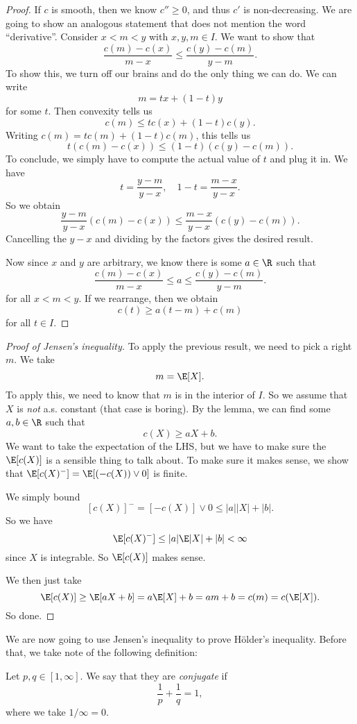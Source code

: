 \documentclass[a4paper]{article}
\begin{document}
\begin{proof}
  If $c$ is smooth, then we know $c'' \geq 0$, and thus $c'$ is non-decreasing. We are going to show an analogous statement that does not mention the word ``derivative''. Consider $x < m < y$ with $x, y, m \in I$. We want to show that
   \[
    \frac{c(m) - c(x)}{m - x} \leq \frac{c(y) - c(m)}{y - m}.
  \]
  To show this, we turn off our brains and do the only thing we can do. We can write
  \[
    m = tx + (1 - t) y
  \]
  for some $t$. Then convexity tells us
  \[
    c(m) \leq t c(x) + (1 - t) c(y).
  \]
  Writing $c(m) = t c(m) + (1 - t) c(m)$, this tells us
  \[
    t (c(m) - c(x)) \leq (1 - t)(c(y) - c(m)).
  \]
  To conclude, we simply have to compute the actual value of $t$ and plug it in. We have
  \[
    t = \frac{y - m}{y - x},\quad 1 - t = \frac{m - x}{y - x}.
  \]
  So we obtain
  \[
    \frac{y - m}{y - x} (c(m) - c(x)) \leq \frac{m - x}{y - x} (c(y) - c(m)).
  \]
  Cancelling the $y - x$ and dividing by the factors gives the desired result.

  Now since $x$ and $y$ are arbitrary, we know there is some $a \in \R$ such that
  \[
    \frac{c(m) - c(x)}{m - x} \leq a \leq \frac{c(y) - c(m)}{y - m}.
  \]
  for all $x < m < y$. If we rearrange, then we obtain
  \[
    c(t) \geq a(t - m) + c(m)
  \]
  for all $t \in I$.
\end{proof}

\begin{proof}[Proof of Jensen's inequality]
  To apply the previous result, we need to pick a right $m$. We take
  \[
    m = \E [X].
  \]
  To apply this, we need to know that $m$ is in the interior of $I$. So we assume that $X$ is \emph{not} a.s. constant (that case is boring). By the lemma, we can find some $a, b \in \R$ such that
  \[
    c(X) \geq aX + b.
  \]
  We want to take the expectation of the LHS, but we have to make sure the $\E[c(X)]$ is a sensible thing to talk about. To make sure it makes sense, we show that $\E[c(X)^-] = \E[(-c(X)) \vee 0]$ is finite.

  We simply bound
  \[
    [c(X)]^- = [-c(X)] \vee 0 \leq |a| |X| + |b|.
  \]
  So we have
  \[
    \E[c(X)^-] \leq |a| \E |X| + |b| < \infty
  \]
  since $X$ is integrable. So $\E[c(X)]$ makes sense.

  We then just take
  \[
    \E[c(X)] \geq \E[aX + b] = a\E[X] + b = am + b = c(m) = c(\E[X]).
  \]
  So done.
\end{proof}

We are now going to use Jensen's inequality to prove H\"older's inequality. Before that, we take note of the following definition:
\begin{defi}[Conjugate]
  Let $p, q \in [1, \infty]$. We say that they are \emph{conjugate} if
  \[
    \frac{1}{p} + \frac{1}{q} = 1,
  \]
  where we take $1/\infty = 0$.
\end{defi}
\end{document}
